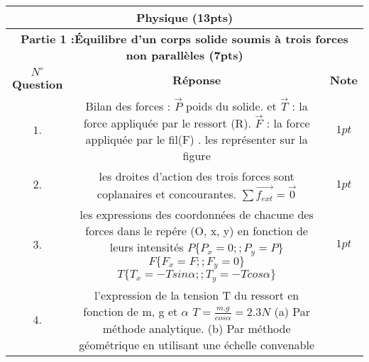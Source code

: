 \documentclass[12pt]{article}
\begin{document}
\begin{center}
  \begin{tabular}{|c||c||c|}
    \hline
         \multicolumn{3}{||c||}{\bf{   \hfill  Physique  \hfill (13pts)} }\\
         \hline
         \multicolumn{3}{||c||}{\bf{Partie 1 :Équilibre d’un corps solide soumis à trois forces non
parallèles \dotfill (7pts)} }\\
\hline
    \textbf{$N^{\circ}$Question } & \textbf{Réponse } & \textbf{Note }\\
    \hline
    $1.$ &
         \makecell{
             Bilan des forces : $\vec{P}$ poids du solide.\\ et $\vec{T}$ : la force appliquée par le ressort (R).\\
         $\vec{F}$ : la force appliquée par le fil(F) .\\
         les représenter sur la figure
     }
    & $1pt$\\\hline
 $2.$ &
         \makecell{
             les droites d’action des trois forces sont coplanaires et concourantes.\\
             $\sum{\vec{f_{ext}}} = \vec{0}$
         }
    & $1pt$\\\hline
 $3.$ &
         \makecell{les expressions des coordonnées de chacune des forces dans \\le repére (O, x, y) en fonction de
leurs intensités
\\$P \{P_x = 0 ;; P_y = P\}$
      \\$F \{F_x = F ;; F_y = 0\}$
      \\$T \{ T_x = -Tsin\alpha ;; T_y = -Tcos\alpha\}$
      }
      & $1pt$\\\hline
 $4.$ &
         \makecell{l’expression de la tension T du ressort \\en fonction de m, g et $\alpha$ $T = \frac{m.g}{cos\alpha} = 2.3N$
         \\(a) Par méthode analytique.
\\(b) Par méthode géométrique en utilisant une échelle convenable}
    

\end{tabular}
\end{center}
\end{document}
